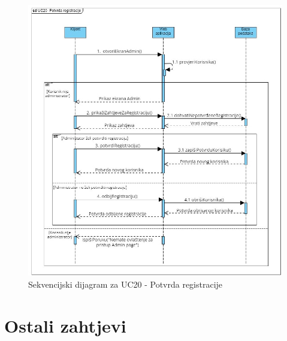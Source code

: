                 \begin{figure}[H] \includegraphics[width=\linewidth]{./dijagrami/PotvrdaRegistracije.jpg}
				    \caption{Sekvencijski dijagram za UC20 - Potvrda registracije}
				    \end{figure}
            \eject
	
		\section{Ostali zahtjevi}
		
